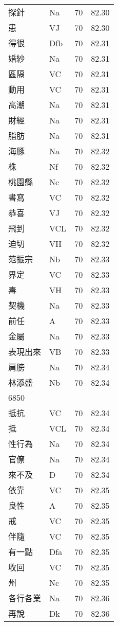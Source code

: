 \documentclass[twocolumn]{book}
\begin{document}
\begin{supertabular}{llrr}
探針 & Na & 70 &  82.30\\
患 & VJ & 70 &  82.30\\
得很 & Dfb & 70 &  82.31\\
婚紗 & Na & 70 &  82.31\\
區隔 & VC & 70 &  82.31\\
動用 & VC & 70 &  82.31\\
高潮 & Na & 70 &  82.31\\
財經 & Na & 70 &  82.31\\
脂肪 & Na & 70 &  82.31\\
海豚 & Na & 70 &  82.32\\
株 & Nf & 70 &  82.32\\
桃園縣 & Nc & 70 &  82.32\\
書寫 & VC & 70 &  82.32\\
恭喜 & VJ & 70 &  82.32\\
飛到 & VCL & 70 &  82.32\\
迫切 & VH & 70 &  82.32\\
范振宗 & Nb & 70 &  82.33\\
界定 & VC & 70 &  82.33\\
毒 & VH & 70 &  82.33\\
契機 & Na & 70 &  82.33\\
前任 & A & 70 &  82.33\\
金屬 & Na & 70 &  82.33\\
表現出來 & VB & 70 &  82.33\\
肩膀 & Na & 70 &  82.34\\
林添盛 & Nb & 70 &  82.34\\
6850\\
抵抗 & VC & 70 &  82.34\\
抵 & VCL & 70 &  82.34\\
性行為 & Na & 70 &  82.34\\
官僚 & Na & 70 &  82.34\\
來不及 & D & 70 &  82.34\\
依靠 & VC & 70 &  82.35\\
良性 & A & 70 &  82.35\\
戒 & VC & 70 &  82.35\\
伴隨 & VC & 70 &  82.35\\
有一點 & Dfa & 70 &  82.35\\
收回 & VC & 70 &  82.35\\
州 & Nc & 70 &  82.35\\
各行各業 & Na & 70 &  82.36\\
再說 & Dk & 70 &  82.36\\

\end{supertabular}
\end{document}

